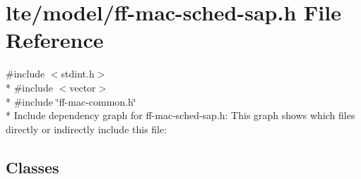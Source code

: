 \hypertarget{ff-mac-sched-sap_8h}{}\section{lte/model/ff-\/mac-\/sched-\/sap.h File Reference}
\label{ff-mac-sched-sap_8h}
{\ttfamily \#include $<$stdint.\+h$>$}\\*
{\ttfamily \#include $<$vector$>$}\\*
{\ttfamily \#include \char`\"{}ff-\/mac-\/common.\+h\char`\"{}}\\*
Include dependency graph for ff-\/mac-\/sched-\/sap.h\+:
This graph shows which files directly or indirectly include this file\+:
\subsection*{Classes}
